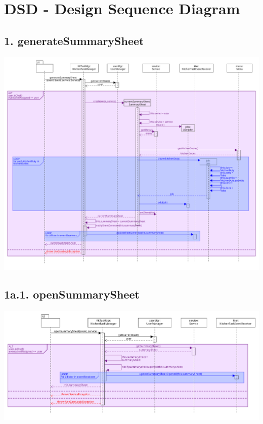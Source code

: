 \chapter{DSD - Design Sequence Diagram}

\section*{1. generateSummarySheet}

\begin{center}
  \includegraphics[scale = 0.32]{images/DSD/DSD 1.png}
\end{center}

\pagebreak 

\section*{1a.1. openSummarySheet}

\begin{center}
  \includegraphics[scale = 0.32]{images/DSD/DSD 1a.png}
\end{center}

